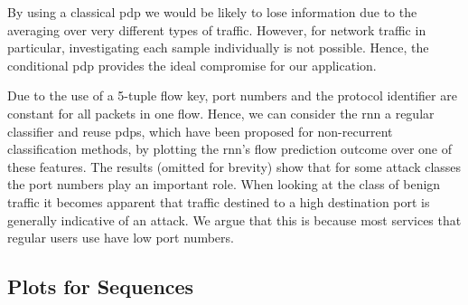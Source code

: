 \documentclass[conference]{IEEEtran}
\begin{document}
By using a classical \gls{pdp} we would be likely to lose information due to the averaging over very different types of traffic. However, for network traffic in particular, investigating each sample individually is not possible. Hence, the conditional \gls{pdp} provides the ideal compromise for our application.

Due to the use of a 5-tuple flow key, port numbers and the protocol identifier are constant for all packets in one flow.
Hence, we can consider the \gls{rnn} a regular classifier and reuse 
\glspl{pdp}, which have been proposed for non-recurrent classification methods, by plotting the \gls{rnn}'s flow prediction outcome over one of these  features.
The results (omitted for brevity) show that for some attack classes the port numbers play an important role. When looking at the class of benign traffic %
it becomes apparent that traffic destined to a high destination port is generally indicative of an attack. We argue that this is because most services that regular users use have low port numbers.

\subsection{Plots for Sequences}
\end{document}
